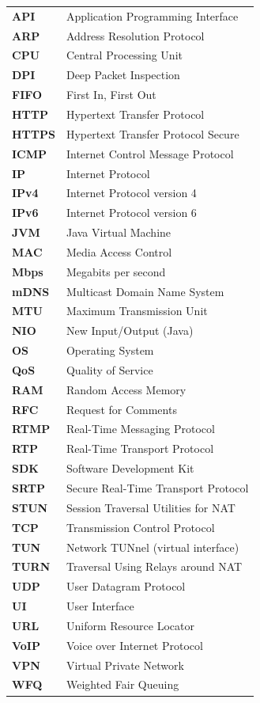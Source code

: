 \begin{tabular}{ll}
    \textbf{API} & Application Programming Interface \\
    \textbf{ARP} & Address Resolution Protocol \\
    \textbf{CPU} & Central Processing Unit \\
    \textbf{DPI} & Deep Packet Inspection \\
    \textbf{FIFO} & First In, First Out \\
    \textbf{HTTP} & Hypertext Transfer Protocol \\
    \textbf{HTTPS} & Hypertext Transfer Protocol Secure \\
    \textbf{ICMP} & Internet Control Message Protocol \\
    \textbf{IP} & Internet Protocol \\
    \textbf{IPv4} & Internet Protocol version 4 \\
    \textbf{IPv6} & Internet Protocol version 6 \\
    \textbf{JVM} & Java Virtual Machine \\
    \textbf{MAC} & Media Access Control \\
    \textbf{Mbps} & Megabits per second \\
    \textbf{mDNS} & Multicast Domain Name System \\
    \textbf{MTU} & Maximum Transmission Unit \\
    \textbf{NIO} & New Input/Output (Java) \\
    \textbf{OS} & Operating System \\
    \textbf{QoS} & Quality of Service \\
    \textbf{RAM} & Random Access Memory \\
    \textbf{RFC} & Request for Comments \\
    \textbf{RTMP} & Real-Time Messaging Protocol \\
    \textbf{RTP} & Real-Time Transport Protocol \\
    \textbf{SDK} & Software Development Kit \\
    \textbf{SRTP} & Secure Real-Time Transport Protocol \\
    \textbf{STUN} & Session Traversal Utilities for NAT \\
    \textbf{TCP} & Transmission Control Protocol \\
    \textbf{TUN} & Network TUNnel (virtual interface) \\
    \textbf{TURN} & Traversal Using Relays around NAT \\
    \textbf{UDP} & User Datagram Protocol \\
    \textbf{UI} & User Interface \\
    \textbf{URL} & Uniform Resource Locator \\
    \textbf{VoIP} & Voice over Internet Protocol \\
    \textbf{VPN} & Virtual Private Network \\
    \textbf{WFQ} & Weighted Fair Queuing \\
\end{tabular}

\cleardoublepage
